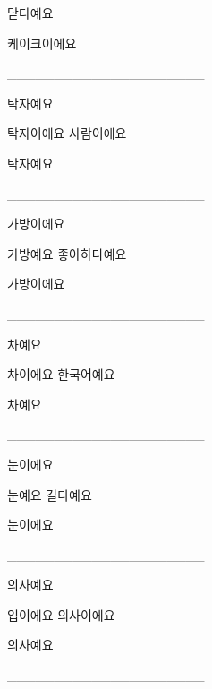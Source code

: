 \documentclass[addpoints, 30pt]{../exam}%
\begin{document}
\begin{questions}
\begin{choices}
\CorrectChoice%
닫다예요%
\end{choices}%
\begin{solution}%
케이크이에요%
\end{solution}%
\question[1]%
\_\_\_\_\_\_\_\_\_\_\_\_\_\_\_\_\_\_\_\_\_%
\begin{choices}%
\begin{solution}%
탁자예요%
\end{solution}%
\choice%
탁자이에요%
\CorrectChoice%
사람이에요%
\end{choices}%
\begin{solution}%
탁자예요%
\end{solution}%
\question[1]%
\_\_\_\_\_\_\_\_\_\_\_\_\_\_\_\_\_\_\_\_\_%
\begin{choices}%
\begin{solution}%
가방이에요%
\end{solution}%
\choice%
가방예요%
\CorrectChoice%
좋아하다예요%
\end{choices}%
\begin{solution}%
가방이에요%
\end{solution}%
\question[1]%
\_\_\_\_\_\_\_\_\_\_\_\_\_\_\_\_\_\_\_\_\_%
\begin{choices}%
\begin{solution}%
차예요%
\end{solution}%
\choice%
차이에요%
\CorrectChoice%
한국어예요%
\end{choices}%
\begin{solution}%
차예요%
\end{solution}%
\question[1]%
\_\_\_\_\_\_\_\_\_\_\_\_\_\_\_\_\_\_\_\_\_%
\begin{choices}%
\begin{solution}%
눈이에요%
\end{solution}%
\choice%
눈예요%
\CorrectChoice%
길다예요%
\end{choices}%
\begin{solution}%
눈이에요%
\end{solution}%
\question[1]%
\_\_\_\_\_\_\_\_\_\_\_\_\_\_\_\_\_\_\_\_\_%
\begin{choices}%
\begin{solution}%
의사예요%
\end{solution}%
\CorrectChoice%
입이에요%
\choice%
의사이에요%
\end{choices}%
\begin{solution}%
의사예요%
\end{solution}%
\question[1]%
\_\_\_\_\_\_\_\_\_\_\_\_\_\_\_\_\_\_\_\_\_%
\begin{choices}%

\end{choices}
\end{questions}
\end{document}
